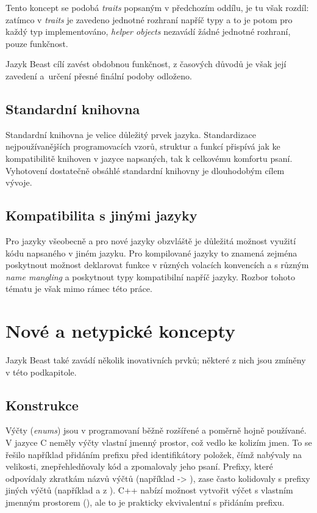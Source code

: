 Tento koncept se podobá \textit{traits} popsaným v předchozím oddílu, je tu však rozdíl: zatímco v \textit{traits} je zavedeno jednotné rozhraní napříč typy a to je potom pro každý typ implementováno, \textit{helper objects} nezavádí žádné jednotné rozhraní, pouze funkčnost.

Jazyk Beast cílí zavést obdobnou funkčnost, z časových důvodů je však její zavedení a~určení přesné finální podoby odloženo.

\subsection{Standardní knihovna}
Standardní knihovna je velice důležitý prvek jazyka. Standardizace nejpoužívanějších programovacích vzorů, struktur a funkcí přispívá jak ke kompatibilitě knihoven v jazyce napsaných, tak k celkovému komfortu psaní. Vyhotovení dostatečně obsáhlé standardní knihovny je dlouhodobým cílem vývoje.

\subsection{Kompatibilita s jinými jazyky}
Pro jazyky všeobecně a pro nové jazyky obzvláště je důležitá možnost využití kódu napsaného v jiném jazyku. Pro kompilované jazyky to znamená zejména poskytnout možnost deklarovat funkce v různých volacích konvencích \cite{Wiki_CallingConvention} a s různým \textit{name mangling} \cite{Wiki_NameMangling} a poskytnout typy kompatibilní napříč jazyky. Rozbor tohoto tématu je však mimo rámec této práce.


\section{Nové a netypické koncepty}
Jazyk Beast také zavádí několik inovativních prvků; některé z nich jsou zmíněny v této podkapitole.

\subsection{Konstrukce } \label{colonIdent}
Výčty (\textit{enums}) jsou v programovaní běžně rozšířené a poměrně hojně používané. V jazyce C neměly výčty vlastní jmenný prostor, což vedlo ke kolizím jmen. To se řešilo například přidáním prefixu před identifikátory položek, čímž nabývaly na velikosti, znepřehledňovaly kód a zpomalovaly jeho psaní. Prefixy, které odpovídaly zkratkám názvů výčtů (například  -> ), zase často kolidovaly s prefixy jiných výčtů (například  a  z ). C++ nabízí možnost vytvořit výčet s vlastním jmenným prostorem (), ale to je prakticky ekvivalentní s přidáním prefixu.

